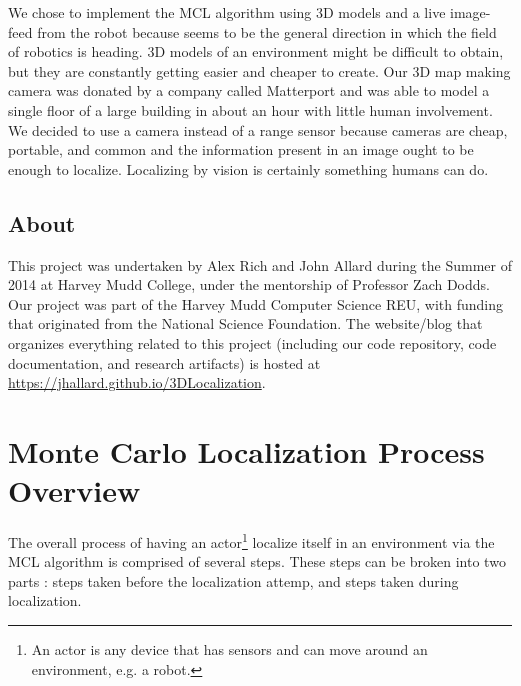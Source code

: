 \documentclass[a4paper,11pt]{article}
\begin{document}
We chose to implement the MCL algorithm using 3D models and a live image-feed from the robot because seems to be the general direction in which the field of robotics is heading. 3D models of an environment might be difficult to obtain, but they are constantly getting easier and cheaper to create. Our 3D map making camera was donated by a company called Matterport and was able to model a single floor of a large building in about an hour with little human involvement. We decided to use a camera instead of a range sensor because cameras are cheap, portable, and common and the information present in an image ought to be enough to localize. Localizing by vision is certainly something humans can do.

 \subsection{About}
 This project was undertaken by Alex Rich and John Allard during the Summer of 2014 at Harvey Mudd College, under the mentorship of Professor Zach Dodds. Our project was part of the Harvey Mudd Computer Science REU, with funding that originated from the National Science Foundation. The website/blog that organizes everything related to this project (including our code repository, code documentation, and research artifacts) is hosted at \\\url{https://jhallard.github.io/3DLocalization}.


  \section{Monte Carlo Localization Process Overview}

The overall process of having an actor\footnote{An actor is any device that has sensors and can move around an environment, e.g. a robot.} localize itself in an environment via the MCL algorithm is comprised of several steps. These steps can be broken into two parts : steps taken before the localization attemp, and steps taken during localization.
\end{document}
